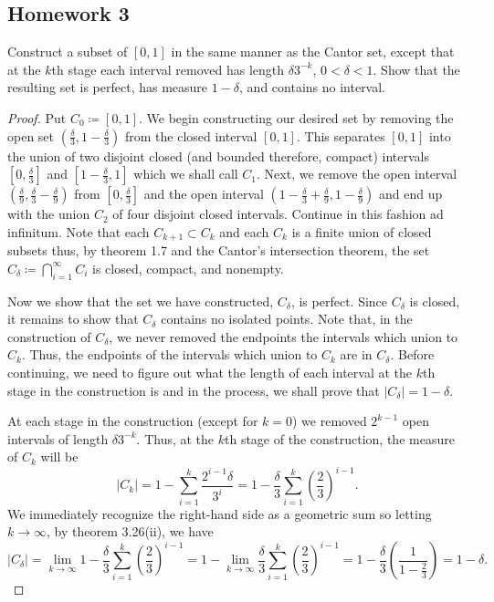 \subsection{Homework 3}
\begin{problem}
Construct a subset of $[0,1]$ in the same manner as the Cantor set, except
that at the $k$th stage each interval removed has length $\delta 3^{-k}$,
$0<\delta<1$. Show that the resulting set is perfect, has measure
$1-\delta$, and contains no interval.
\end{problem}
\begin{proof}
Put $C_0\coloneqq[0,1]$. We begin constructing our desired set by
removing the open set $\left(\frac{\delta}{3},1-\frac{\delta}{3}\right)$
from the closed interval $[0,1]$. This separates $[0,1]$ into the union of
two disjoint closed (and bounded therefore, compact) intervals
$\left[0,\tfrac{\delta}{3}\right]$ and $\left[1-\tfrac{\delta}{3},1\right]$
which we shall call $C_1$. Next, we remove the open
interval $\left(\tfrac{\delta}{9},\frac{\delta}{3}-\frac{\delta}{9}\right)$
from $\left[0,\tfrac{\delta}{3}\right]$ and the open interval
$\left(1-\tfrac{\delta}{3}+\tfrac{\delta}{9},1-\tfrac{\delta}{9}\right)$
and end up with the union $C_2$ of four disjoint closed intervals. Continue
in this fashion ad infinitum. Note that each $C_{k+1}\subset C_k$ and each
$C_k$ is a finite union of closed subsets thus, by theorem 1.7 and the
Cantor's intersection theorem, the set
$C_\delta\coloneqq\bigcap_{i=1}^\infty C_i$ is closed, compact, and nonempty.

Now we show that the set we have constructed, $C_\delta$, is perfect. Since
$C_\delta$ is closed, it remains to show that $C_\delta$ contains no
isolated points. Note that, in the construction of $C_\delta$, we never
removed the endpoints the intervals which union to $C_k$. Thus, the
endpoints of the intervals which union to $C_k$ are in $C_\delta$. Before
continuing, we need to figure out what the length of each interval at the
$k$th stage in the construction is and in the process, we shall prove that
$\left|C_\delta\right|=1-\delta$.

At each stage in the construction (except for $k=0$) we removed $2^{k-1}$
open intervals of length $\delta 3^{-k}$. Thus, at the $k$th stage of the
construction, the measure of $C_k$ will be
\[
\left|C_k\right|
=1-\sum_{i=1}^k\frac{2^{i-1}\delta}{3^i}=
1-\frac{\delta}{3}\sum_{i=1}^k\left(\frac{2}{3}\right)^{i-1}.
\]
We immediately recognize the right-hand side as a geometric sum so letting
$k\to\infty$, by theorem 3.26(ii), we have
\[
\left|C_\delta\right|
=\lim_{k\to\infty}1-\frac{\delta}{3}\sum_{i=1}^k\left(\frac{2}{3}\right)^{i-1}
=1-\lim_{k\to\infty}\frac{\delta}{3}\sum_{i=1}^k\left(\frac{2}{3}\right)^{i-1}
=1-\frac{\delta}{3}\left(\frac{1}{1-\frac{2}{3}}\right)=1-\delta.
\]


\end{proof}
